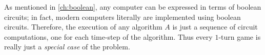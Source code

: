 As mentioned in \cref{ch:boolean}, any computer can be expressed in terms of
boolean circuits; in fact, modern computers literally are implemented using
boolean circuits. Therefore, the execution of any algorithm \(A\) is just a
sequence of circuit computations, one for each time-step of the algorithm. Thus
every \(1\)-turn game is really just a \emph{special case} of the
 problem.

%
%
%
%
%
%
%
%
%
